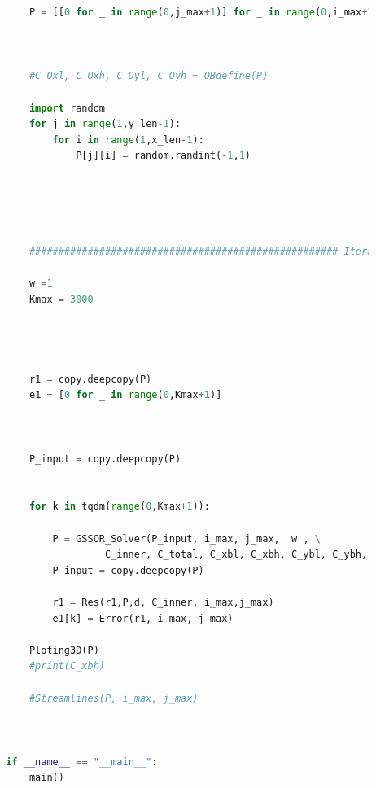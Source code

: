 \documentclass[12pt]{article}
\begin{document}
\begin{scriptsize}
\begin{lstlisting}[language=python,caption={Python code-Potential Flow}]
            
            
            
            
        
            P = [[0 for _ in range(0,j_max+1)] for _ in range(0,i_max+1)]
        
        
        
            #C_Oxl, C_Oxh, C_Oyl, C_Oyh = OBdefine(P)
        
            import random
            for j in range(1,y_len-1):
                for i in range(1,x_len-1):
                    P[j][i] = random.randint(-1,1)
        
        
        
        
        
            ##################################################### Iteration Part ###################################################################################
        
            w =1
            Kmax = 3000
        
            
        
        
            r1 = copy.deepcopy(P)
            e1 = [0 for _ in range(0,Kmax+1)]
        
        
        
            P_input = copy.deepcopy(P)
            
        
            for k in tqdm(range(0,Kmax+1)):
        
                P = GSSOR_Solver(P_input, i_max, j_max,  w , \
                         C_inner, C_total, C_xbl, C_xbh, C_ybl, C_ybh, C_edge, C_xlyl, C_xlyh, C_xhyl, C_xhyh)
                P_input = copy.deepcopy(P)
        
                r1 = Res(r1,P,d, C_inner, i_max,j_max)
                e1[k] = Error(r1, i_max, j_max)
                
            Ploting3D(P)
            #print(C_xbh)
        
            #Streamlines(P, i_max, j_max)
        
        
        
        if __name__ == "__main__":
            main()
        
        

        
        

\end{lstlisting}
\end{scriptsize}
\end{document}
